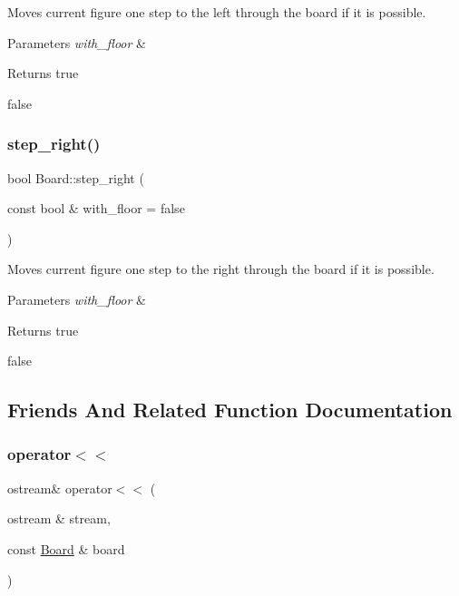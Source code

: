 Moves current figure one step to the left through the board if it is possible. 


\begin{DoxyParams}{Parameters}
{\em with\+\_\+floor} & \\
\hline
\end{DoxyParams}
\begin{DoxyReturn}{Returns}
true 

false 
\end{DoxyReturn}
\mbox{\label{classBoard_ae31add3ef3edda667691e38cc85d2db5}} 
\subsubsection{\texorpdfstring{step\+\_\+right()}{step\_right()}}
{\footnotesize\ttfamily bool Board\+::step\+\_\+right (\begin{DoxyParamCaption}\item[{const bool \&}]{with\+\_\+floor = {\ttfamily false} }\end{DoxyParamCaption})}



Moves current figure one step to the right through the board if it is possible. 


\begin{DoxyParams}{Parameters}
{\em with\+\_\+floor} & \\
\hline
\end{DoxyParams}
\begin{DoxyReturn}{Returns}
true 

false 
\end{DoxyReturn}


\subsection{Friends And Related Function Documentation}
\mbox{\label{classBoard_ad17d0b33d9b8031d642c97ae1d1b1c7c}} 
\subsubsection{\texorpdfstring{operator$<$$<$}{operator<<}}
{\footnotesize\ttfamily ostream\& operator$<$$<$ (\begin{DoxyParamCaption}\item[{ostream \&}]{stream,  }\item[{const \hyperlink{classBoard}{Board} \&}]{board }\end{DoxyParamCaption})\hspace{0.3cm}{\ttfamily [friend]}}



